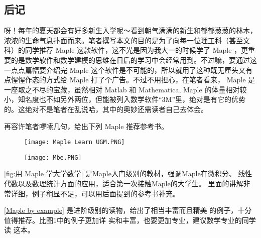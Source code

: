 \onecolumn
\setlength{\parindent}{2em}
\begin{large}
    \section*{后记}

    \begin{spacing}{1.5}
        \indent 呀！每年的夏天都会有好多新生入学呢～看到朝气满满的新生和郁郁葱葱的林木，浓浓的生命气息扑面而来。笔者撰写本文的目的是为了向每一位理工科（甚至文科）的同学推荐 Maple 这款软件，这不光是因为我大一的时候学了 Maple ，更重要的是数学软件和数学建模的思维在日后的学习中会经常用到。不过嘛，要通过这一点点篇幅要介绍完 Maple 这个软件是不可能的，所以就用了这种既无厘头又有点惺惺作态的方式给 Maple 打了个广告。不过不用担心，在笔者看来， Maple 是一座取之不尽的宝藏，虽然相对 Matlab 和 Mathematica, Maple 的体量相对较小，知名度也不如另外两位，但能被列入数学软件“3M”里，绝对是有它的优势的。这绝对不是笔者在乱说哈，其中的奥妙还需读者自己去体会。

        再容许笔者啰嗦几句，给出下列 Maple 推荐参考书。

        \begin{figure}[htbp]
            \centering
            \begin{minipage}[t]
                {0.45\textwidth}
                \centering
                \texttt{[image: Maple Learn UGM.PNG]}
                \caption{\textcite[用 Maple 学大学数学]{徐俊林maple}}

                \label{fig:用 Maple 学大学数学}
            \end{minipage}
            \quad
            \begin{minipage}[t]
                {0.45\textwidth}
                \centering
                \texttt{[image: Mbe.PNG]}
                \caption{\textcite[Maple by example]{abell2005maple}}
                \label{Maple by example}
            \end{minipage}
        \end{figure}
        \autoref{fig:用 Maple 学大学数学} \textcite[用 Maple 学大学数学]{徐俊林maple} 是Maple入门级别的教材，强调Maple在微积分、
        线性代数以及数理统计方面的应用，适合第一次接触Maple的大学生。
        里面的讲解非常详细，例子稍显不足，可以用后面提到的参考书补充。

        \autoref{Maple by example} \textcite[Maple by example]{abell2005maple} 是进阶级别的读物，给出了相当丰富而且精美
        的例子，十分值得推荐。比图1中的例子更加详
        实和丰富，也要更加专业，建议数学专业的同学读
        这本。


\end{spacing}
\end{large}
